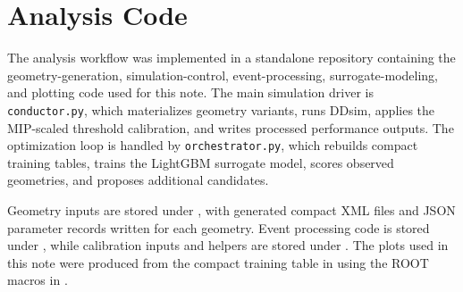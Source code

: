 \appendix
\section{Analysis Code}\label{app:analysis_code}

\noindent The analysis workflow was implemented in a standalone repository containing the geometry-generation, simulation-control, event-processing, surrogate-modeling, and plotting 
code used for this note. The main simulation driver is \texttt{conductor.py}, which materializes geometry variants, runs DDsim, applies the MIP-scaled threshold calibration, and 
writes processed performance outputs. The optimization loop is handled by \texttt{orchestrator.py}, which rebuilds compact training tables, trains the LightGBM surrogate model, 
scores observed geometries, and proposes additional candidates.

\noindent Geometry inputs are stored under , with generated compact XML files and JSON parameter records written for each geometry. Event processing code is stored 
under , while calibration inputs and helpers are stored under . The plots used in this note were produced from the compact 
training table in  using the ROOT macros in .

